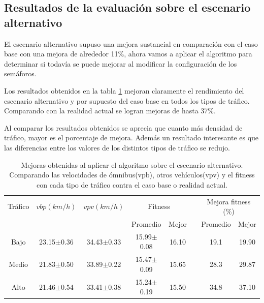 \subsection{Resultados de la evaluación sobre el escenario alternativo}

El escenario alternativo supuso una mejora sustancial en comparación con el caso base con una mejora de alrededor 11\%, ahora vamos a aplicar el algoritmo para determinar si todavía se puede mejorar al modificar la configuración de los semáforos.

Los resultados obtenidos en la tabla \ref{table:mejoras_trafico_alternativo_algoritmo}  mejoran claramente el rendimiento del escenario alternativo y por supuesto del caso base en todos los tipos de tráfico. Comparando con la realidad actual se logran mejoras de hasta 37\%. 

Al comparar los resultados obtenidos se aprecia que cuanto más densidad de tráfico, mayor es el porcentaje de mejora. Además un resultado interesante es que las diferencias entre los valores de los distintos tipos de tráfico se redujo.




\begin{table}[h]
	\renewcommand{\arraystretch}{1.2}
	\caption{Mejoras obtenidas al aplicar el algoritmo sobre el escenario alternativo. Comparando las velocidades de ómnibus(vpb), otros vehículos(vpv) y el fitness con cada tipo de tráfico contra el caso base o realidad actual.}
	\label{table:mejoras_trafico_alternativo_algoritmo}
	\centering
	\begin{tabular}{cccccccc}
		\hline 
		Tráfico& 
		$vbp(km/h)$& 
		$vpv(km/h)$&
		\multicolumn{2}{c}{Fitness}&  & 
		\multicolumn{2}{c}{Mejora fitness (\%)}\\  \cline{4-5} \cline{7-8}&     &     & \multicolumn{1}{c}{Promedio} & \multicolumn{1}{c}{Mejor} &  & \multicolumn{1}{c}{Promedio} & \multicolumn{1}{c}{Mejor} \\ \hline

		Bajo & 23.15$\pm$0.36 & 34.43$\pm$0.33 & 15.99$\pm$0.08 & 16.10 & & 19.1& 19.90 \\
		Medio & 21.83$\pm$0.50  & 33.89$\pm$0.22 & 15.47$\pm$0.09& 15.65 & & 28.3 & 29.87\\
		Alto & 21.46$\pm$0.54  & 33.41$\pm$0.38 & 15.24$\pm$0.19& 15.50 & & 34.8 & 37.10\\	
		\hline		    
	\end{tabular}
\end{table}


